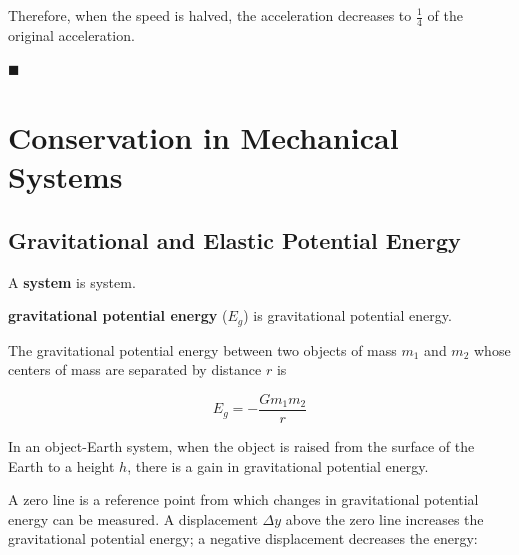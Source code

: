 \documentclass[dvipsnames]{article}
\newif\ifShowUnitVIII
\begin{document}
Therefore, when the speed is halved, the acceleration decreases to $\frac{1}{4}$ of the original acceleration.

\hfill $\blacksquare$


\fi

\clearpage

\section{Conservation in Mechanical Systems}

\ifShowUnitVIII

\subsection{Gravitational and Elastic Potential Energy}

A \textbf{\gls{system}} is \glsdesc{system}.

\textbf{\Gls{gravitational potential energy}} ($E_g$) is \glsdesc{gravitational potential energy}.

The gravitational potential energy between two objects of mass $m_1$ and $m_2$ whose centers of mass are separated by distance $r$ is

\begin{equation*}
    E_g = -\frac{G m_1 m_2}{r}
\end{equation*}

In an object-Earth system, when the object is raised from the surface of the Earth to a height $h$, there is a gain in gravitational potential energy.


\begin{center}
\end{center}

A zero line is a reference point from which changes in gravitational potential energy can be measured. A displacement $\Delta y$ above the zero line increases the gravitational potential energy; a negative displacement decreases the energy:
\end{document}
